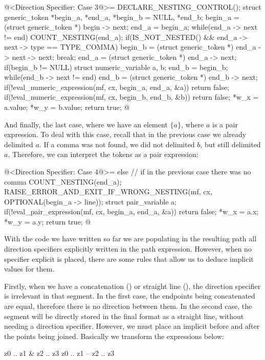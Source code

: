 {{{{{\iniciocodigo
@<Direction Specifier: Case 3@>=
DECLARE_NESTING_CONTROL();
struct generic_token *begin_a, *end_a, *begin_b = NULL, *end_b;
begin_a = (struct generic_token *) begin -> next;
end_a = begin_a;
while(end_a -> next != end){
  COUNT_NESTING(end_a);
  if(IS_NOT_NESTED() && end_a -> next -> type == TYPE_COMMA){
    begin_b = (struct generic_token *) end_a -> next -> next;
    break;
  }
  end_a = (struct generic_token *) end_a -> next;
}
if(begin_b != NULL){
  struct numeric_variable a, b;
  end_b = begin_b;
  while(end_b -> next != end)
    end_b = (struct generic_token *) end_b -> next;
  if(!eval_numeric_expression(mf, cx, begin_a, end_a, &a))
    return false;
  if(!eval_numeric_expression(mf, cx, begin_b, end_b, &b))
    return false;
  *w_x = a.value;
  *w_y = b.value;
  return true;
}
@
\fimcodigo

And finally, the last case, where we have an element $\{a\}$, where
$a$ is a pair expression. To deal with this case, recall that in the
previous case we already delimited $a$. If a comma was not found, we
did not delimited $b$, but still delimited $a$. Therefore, we can
interpret the tokens as a pair expression:

\iniciocodigo
@<Direction Specifier: Case 4@>=
else{ // if in the previous case there was no comma
  COUNT_NESTING(end_a);
  RAISE_ERROR_AND_EXIT_IF_WRONG_NESTING(mf, cx, OPTIONAL(begin_a -> line));
  struct pair_variable a;
  if(!eval_pair_expression(mf, cx, begin_a, end_a, &a))
    return false;
  *w_x = a.x;
  *w_y = a.y;
  return true;
}
@
\fimcodigo

With the code we have written so far we are populating in the
resulting path all direction specifiers explicitly written in the path
expression.  However, when no specifier explicit is placed, there are
some rules that allow us to deduce implicit values ​​for them.

Firstly, when we have a concatenation (\monoespaco{\&}) or straight
line (\monoespaco{--}), the direction specifier is irrelevant in that
segment. In the first case, the endpoints being concatenated are
equal, therefore there is no direction between them. In the second
case, the segment will be directly stored in the final format as a
straight line, without needing a direction specifier.  However, we
must place an implicit  before and after the points
being joined. Basically we transform the expressions below:

\alinhaverbatim
z0 .. z1 & z2 .. z3
z0 .. z1 -- z2 .. z3
\alinhanormal

}}}}}
